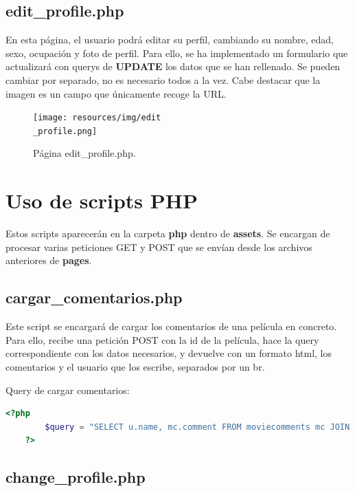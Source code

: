 \documentclass[a4paper, 12pt]{report}
\begin{document}
    \section{edit\_profile.php}

    En esta página, el usuario podrá editar su perfil, cambiando su nombre, edad, sexo, ocupación y foto de perfil. Para ello, se ha implementado un formulario que actualizará con querys de \textbf{UPDATE} los datos que se han rellenado. Se pueden cambiar por separado, no es necesario todos a la vez. Cabe destacar que la imagen es un campo que únicamente recoge la URL.

    \begin{figure}[H]
        \centering
        \texttt{[image: resources/img/edit\\\_profile.png]}
        \caption{Página edit\_profile.php.}
        \label{fig:edit}
    \end{figure}

    \chapter{Uso de scripts PHP}

    Estos scripts aparecerán en la carpeta \textbf{php} dentro de \textbf{assets}. Se encargan de procesar varias peticiones GET y POST que se envían desde los archivos anteriores de \textbf{pages}.

    \section{cargar\_comentarios.php}

    Este script se encargará de cargar los comentarios de una película en concreto. Para ello, recibe una petición POST con la id de la película, hace la query correspondiente con los datos necesarios, y devuelve con un formato html, los comentarios y el usuario que los escribe, separados por un br.

    Query de cargar comentarios:
    \begin{lstlisting}[style=ruled, language=php, caption={Query de cargar\_comentarios.php.}, gobble=4]
    <?php
        $query = "SELECT u.name, mc.comment FROM moviecomments mc JOIN users u ON mc.user_id = u.id WHERE mc.movie_id = $movie_id";
    ?>
    \end{lstlisting}


    \section{change\_profile.php}
\end{document}
